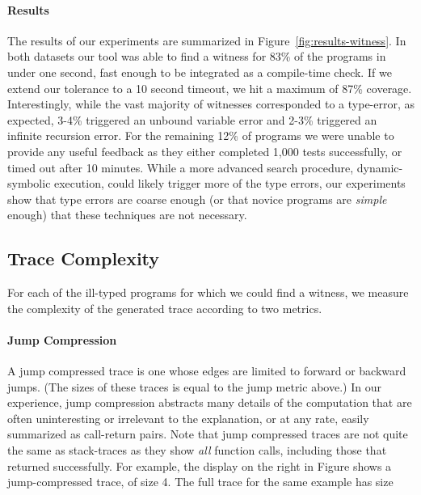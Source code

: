 \paragraph{Results}
\label{sec:results-witness}
The results of our experiments are summarized in
Figure~\ref{fig:results-witness}.
%
In both datasets our tool was able to find a witness for 83\% of the
programs in under one second, \ie fast enough to be integrated as a
compile-time check. If we extend our tolerance to a 10 second timeout,
we hit a maximum of 87\% coverage.
%
Interestingly, while the vast majority of witnesses corresponded to a
type-error, as expected, 3-4\% triggered an unbound variable error and
2-3\% triggered an infinite recursion error.
%
For the remaining 12\% of programs we were unable to provide any useful
feedback as they either completed 1,000 tests successfully, or timed out
after 10 minutes.
%
%
While a more advanced search procedure, \eg dynamic-symbolic execution,
could likely trigger more of the type errors, our experiments show that
type errors are coarse enough (or that novice programs are \emph{simple}
enough) that these techniques are not necessary.


\subsection{Trace Complexity}
\label{sec:trace-complexity}

For each of the ill-typed programs for which we could
find a witness, we measure the complexity of the generated
trace according to two metrics.

\paragraph{Jump Compression}
%
A jump compressed trace is one whose edges are limited to forward
or backward jumps. (The sizes of these traces is equal to the jump
metric above.)
%
In our experience, jump compression abstracts many details of the
computation that are often uninteresting or irrelevant to the
explanation, or at any rate, easily summarized as call-return
pairs.
%
Note that jump compressed traces are not quite the same as
stack-traces as they show \emph{all} function calls, including
those that returned successfully.
%
For example, the display on the right in Figure shows
a jump-compressed trace, of size 4. The full trace for
the same example has size 

